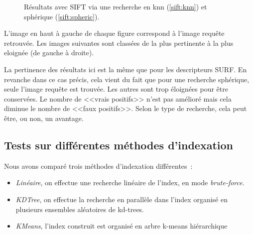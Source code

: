 \documentclass{article}
\begin{document}
\begin{figure}[!ht]%
  \centering
  \hspace{0.01\textwidth}
  \caption{Résultats avec SIFT via une recherche en knn (\ref{sift:knn}) et sphérique (\ref{sift:spheric}).}
  \label{sift}
\end{figure}

L'image en haut à gauche de chaque figure correspond à l'image requête retrouvée. Les images suivantes sont
classées de la plus pertinente à la plus eloignée (de gauche à droite).

La pertinence des résultats ici est la même que pour les descripteurs SURF. En revanche dans ce cas précis, cela vient du fait que pour une recherche sphérique,
seule l'image requête est trouvée. Les autres sont trop éloignées pour être conservées. Le nombre de <<vrais
positifs>> n'est pas amélioré mais cela diminue 
le nombre de <<faux positifs>>. Selon le type de recherche, cela peut être, ou non, un avantage.

\subsection{Tests sur différentes méthodes d'indexation}

Nous avons comparé trois méthodes d'indexation différentes~:

\begin{itemize}
    \item {\em Linéaire}, on effectue une recherche linéaire de l'index, en mode {\em brute-force}.
    \item {\em KDTree}, on effectue la recherche en parallèle dans l'index organisé en plusieurs ensembles aléatoires de kd-trees.
    \item {\em KMeans}, l'index construit est organisé en arbre k-means hiérarchique
\end{itemize}
\end{document}
